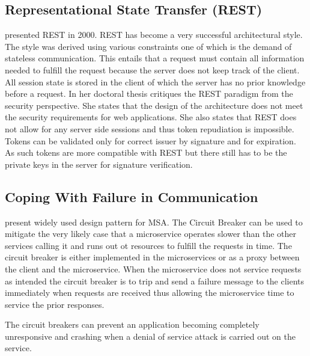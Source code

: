 \subsection{Representational State Transfer (REST)}
\begin{sloppypar}
    \citet{restroy} presented REST in 2000. REST has become a very successful 
    architectural style. The style was derived using various constraints one of 
    which is the demand of stateless communication. This entails that a request 
    must contain all information needed to fulfill the request because the 
    server does not keep track of the client. All session state is stored in 
    the client of which the server has no prior knowledge before a request. In 
    her doctoral thesis \citet{secchalmsa} critiques the REST paradigm from the 
    security perspective. She states that the design of the architecture does 
    not meet the security requirements for web applications. She also states 
    that REST does not allow for any server side sessions and thus token 
    repudiation is impossible. Tokens can be validated only for correct issuer 
    by signature and for expiration. As such tokens are more compatible with 
    REST but there still has to be the private keys in the server for signature 
    verification.
\end{sloppypar}


\subsection{Coping With Failure in Communication}
\begin{sloppypar}
    \citet{DBLP:journals/corr/MontesiW16} present widely used design pattern for MSA.
    The Circuit Breaker can be used to mitigate the very likely case that a 
    microservice operates slower than the other services calling it and 
    runs out ot resources to fulfill the requests in time. The circuit breaker
    is either implemented in the microservices or as a proxy between the client 
    and the microservice. When the microservice does not service requests as 
    intended the circuit breaker is to trip and send a failure message to the 
    clients immediately when requests are received thus allowing the 
    microservice time to service the prior responses.
\end{sloppypar}
\begin{sloppypar}
    The circuit breakers can prevent an application becoming completely 
    unresponsive and crashing when a denial of service attack is carried out on 
    the service.
\end{sloppypar}


